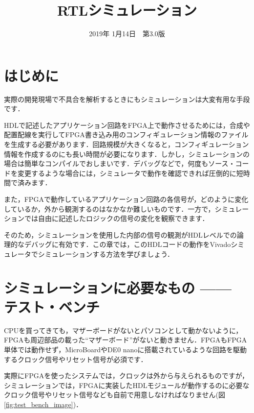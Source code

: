 \documentclass[a4paper,dvipdfmx]{jsarticle}
\begin{document}
\title{RTLシミュレーション}
\author{}
\date{2019年 1月14日~~第3.0版}
\maketitle

\section{はじめに}
実際の開発現場で不具合を解析するときにもシミュレーションは大変有用な手段です．

HDLで記述したアプリケーション回路をFPGA上で動作させるためには，合成や配置配線を実行してFPGA書き込み用のコンフィギュレーション情報のファイルを生成する必要があります．回路規模が大きくなると，コンフィギュレーション情報を作成するのにも長い時間が必要になります．しかし，シミュレーションの場合は簡単なコンパイルでおしまいです．デバッグなどで，何度もソース・コードを変更するような場合には，シミュレータで動作を確認できれば圧倒的に短時間で済みます．

また，FPGAで動作しているアプリケーション回路の各信号が，どのように変化しているか，外から観測するのはなかなか難しいものです．一方で，シミュレーションでは自由に記述したロジックの信号の変化を観察できます．

そのため，シミュレーションを使用した内部の信号の観測がHDLレベルでの論理的なデバッグに有効です．この章では，このHDLコードの動作をVivadoシミュレータでシミュレーションする方法を学びましょう．

\section{シミュレーションに必要なもの —— テスト・ベンチ}
CPUを買ってきても，マザーボードがないとパソコンとして動かないように，FPGAも周辺部品の載った``マザーボード''がないと動きません．FPGAもFPGA単体では動作せず，MicroBoardやDE0 nanoに搭載されているような回路を駆動するクロック信号やリセット信号が必須です．

実際にFPGAを使ったシステムでは，クロックは外から与えられるものですが，シミュレーションでは，FPGAに実装したHDLモジュールが動作するのに必要なクロック信号やリセット信号なども自前で用意しなければなりません(図\ref{fig:test_bench_image})．
\end{document}
